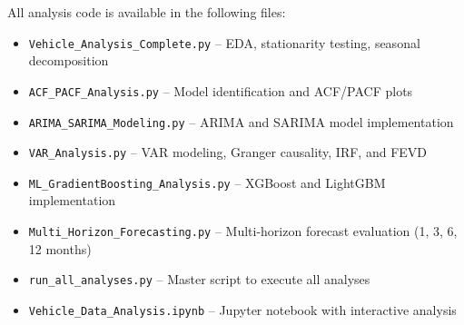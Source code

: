 \documentclass[12pt]{article}
\begin{document}
All analysis code is available in the following files:
\begin{itemize}
    \item \texttt{Vehicle\_Analysis\_Complete.py} -- EDA, stationarity testing, seasonal decomposition
    \item \texttt{ACF\_PACF\_Analysis.py} -- Model identification and ACF/PACF plots
    \item \texttt{ARIMA\_SARIMA\_Modeling.py} -- ARIMA and SARIMA model implementation
    \item \texttt{VAR\_Analysis.py} -- VAR modeling, Granger causality, IRF, and FEVD
    \item \texttt{ML\_GradientBoosting\_Analysis.py} -- XGBoost and LightGBM implementation
    \item \texttt{Multi\_Horizon\_Forecasting.py} -- Multi-horizon forecast evaluation (1, 3, 6, 12 months)
    \item \texttt{run\_all\_analyses.py} -- Master script to execute all analyses
    \item \texttt{Vehicle\_Data\_Analysis.ipynb} -- Jupyter notebook with interactive analysis
\end{itemize}
\end{document}
